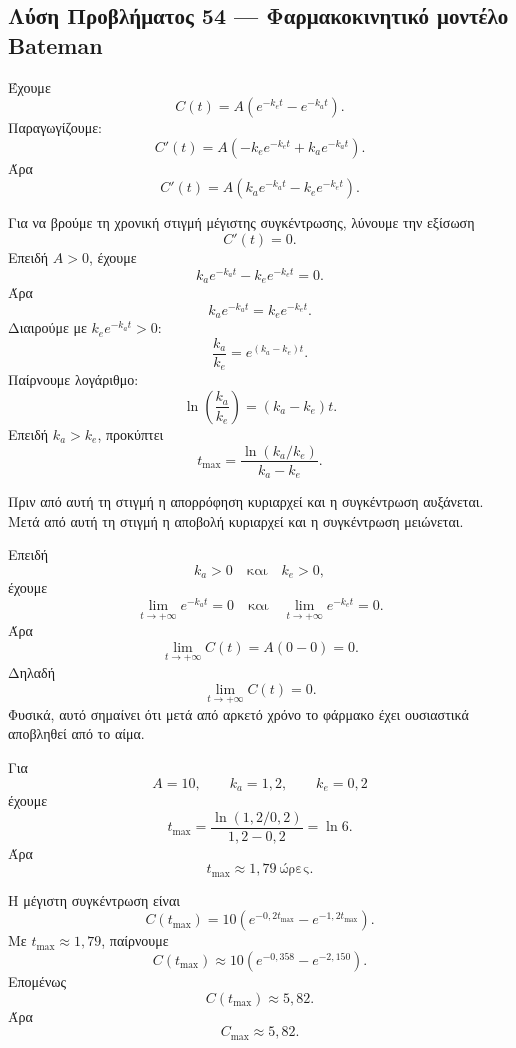 \subsection*{Λύση Προβλήματος 54 --- Φαρμακοκινητικό μοντέλο Bateman}

\begin{alist}
  \item Έχουμε
        \[
          C(t)=A\left(e^{-k_et}-e^{-k_at}\right).
        \]
        Παραγωγίζουμε:
        \[
          C'(t)
          =
          A\left(-k_e e^{-k_et}+k_a e^{-k_at}\right).
        \]
        Άρα
        \[
          {
          C'(t)=A\left(k_a e^{-k_at}-k_e e^{-k_et}\right)
          }.
        \]

  \item Για να βρούμε τη χρονική στιγμή μέγιστης συγκέντρωσης, λύνουμε
        την εξίσωση
        \[
          C'(t)=0.
        \]
        Επειδή \(A>0\), έχουμε
        \[
          k_a e^{-k_at}-k_e e^{-k_et}=0.
        \]
        Άρα
        \[
          k_a e^{-k_at}=k_e e^{-k_et}.
        \]
        Διαιρούμε με \(k_e e^{-k_at}>0\):
        \[
          \frac{k_a}{k_e}
          =
          e^{(k_a-k_e)t}.
        \]
        Παίρνουμε λογάριθμο:
        \[
          \ln\left(\frac{k_a}{k_e}\right)
          =
          (k_a-k_e)t.
        \]
        Επειδή \(k_a>k_e\), προκύπτει
        \[
          {
          t_{\max}
          =
          \frac{\ln(k_a/k_e)}{k_a-k_e}
          }.
        \]

        Πριν από αυτή τη στιγμή η απορρόφηση κυριαρχεί και η συγκέντρωση
        αυξάνεται. Μετά από αυτή τη στιγμή η αποβολή κυριαρχεί και η
        συγκέντρωση μειώνεται.

  \item Επειδή
        \[
          k_a>0
          \quad\text{και}\quad
          k_e>0,
        \]
        έχουμε
        \[
          \lim_{t\to+\infty}e^{-k_at}=0
          \quad\text{και}\quad
          \lim_{t\to+\infty}e^{-k_et}=0.
        \]
        Άρα
        \[
          \lim_{t\to+\infty}C(t)
          =
          A(0-0)
          =
          0.
        \]
        Δηλαδή
        \[
          {\lim_{t\to+\infty}C(t)=0}.
        \]
        Φυσικά, αυτό σημαίνει ότι μετά από αρκετό χρόνο το φάρμακο έχει
        ουσιαστικά αποβληθεί από το αίμα.

  \item Για
        \[
          A=10,\qquad k_a=1{,}2,\qquad k_e=0{,}2
        \]
        έχουμε
        \[
          t_{\max}
          =
          \frac{\ln(1{,}2/0{,}2)}{1{,}2-0{,}2}
          =
          \ln6.
        \]
        Άρα
        \[
          {t_{\max}\approx1{,}79\ \text{ώρες}}.
        \]

        Η μέγιστη συγκέντρωση είναι
        \[
          C(t_{\max})
          =
          10\left(e^{-0{,}2t_{\max}}-e^{-1{,}2t_{\max}}\right).
        \]
        Με \(t_{\max}\approx1{,}79\), παίρνουμε
        \[
          C(t_{\max})
          \approx
          10\left(e^{-0{,}358}-e^{-2{,}150}\right).
        \]
        Επομένως
        \[
          C(t_{\max})
          \approx
          5{,}82.
        \]
        Άρα
        \[
          {C_{\max}\approx5{,}82}.
        \]
\end{alist}
